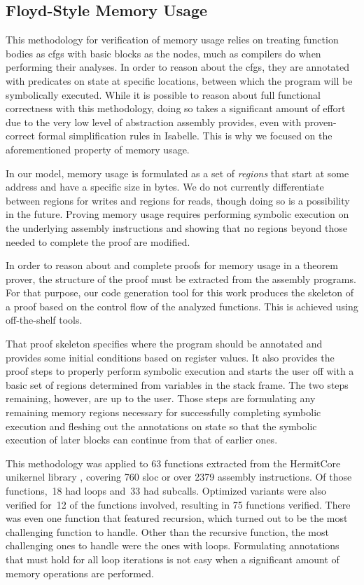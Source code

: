 \subsection{Floyd-Style Memory Usage}
This methodology for verification of memory usage relies on treating function bodies as \acp{cfg} with basic blocks as the nodes, much as compilers do when performing their analyses.
In order to reason about the \acp{cfg}, they are annotated with predicates on state at specific locations, between which the program will be symbolically executed.
While it is possible to reason about full functional correctness with this methodology, doing so takes a significant amount of effort due to the very low level of abstraction assembly provides, even with proven-correct formal simplification rules in Isabelle.
This is why we focused on the aforementioned property of memory usage.

In our model, memory usage is formulated as a set of \emph{regions} that start at some address and have a specific size in bytes.
We do not currently differentiate between regions for writes and regions for reads, though doing so is a possibility in the future.
Proving memory usage requires performing symbolic execution on the underlying assembly instructions and showing that no regions beyond those needed to complete the proof are modified.

In order to reason about and complete proofs for memory usage in a theorem prover, the structure of the proof must be extracted from the assembly programs.
For that purpose, our code generation tool for this work produces the skeleton of a proof based on the control flow of the analyzed functions.
This is achieved using off-the-shelf tools.

That proof skeleton specifies where the program should be annotated and provides some initial conditions based on register values.
It also provides the proof steps to properly perform symbolic execution and starts the user off with a basic set of regions determined from variables in the stack frame.
The two steps remaining, however, are up to the user.
Those steps are formulating any remaining memory regions necessary for successfully completing symbolic execution and fleshing out the annotations on state so that the symbolic execution of later blocks can continue from that of earlier ones.

This methodology was applied to \num{63} functions extracted from the HermitCore \autocite{lankes2016hermitcore} unikernel library \autocite{madhavapeddy2014unikernels}, covering \num{760} \ac{sloc} or over \num{2379} assembly instructions.
Of those functions,~\num{18} had loops and~\num{33} had subcalls.
Optimized variants were also verified for~\num{12} of the functions involved, resulting in \num{75} functions verified.
There was even one function that featured recursion, which turned out to be the most challenging function to handle.
Other than the recursive function, the most challenging ones to handle were the ones with loops.
Formulating annotations that must hold for all loop iterations is not easy when a significant amount of memory operations are performed.

